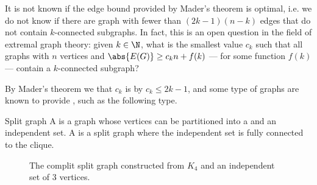\documentclass[a4paper, 12pt]{report}
\begin{document}
    It is not known if the edge bound provided by Mader's theorem is optimal, i.e. we do not know if there are graph with fewer than $(2k - 1)(n - k)$ edges that do not contain $k$-connected subgraphs. In fact, this is an open question in the field of extremal graph theory: given $k \in \N$, what is the smallest value $c_k$ such that all graphs with $n$ vertices and $\abs{E(G)} \ge c_kn + f(k)$ --- for some function $f(k)$ --- contain a $k$-connected subgraph?

    By Mader's theorem we that $c_k$ is  by $c_k \le 2k - 1$, and some type of graphs are known to provide , such as the following type.

    \begin{frameddefn}{Split graph}
        A  is a graph whose vertices can be partitioned into a  and an independent set. A  is a split graph where the independent set is fully connected to the clique.
    \end{frameddefn}

    \begin{figure}[H]
        \centering
        \caption{The complit split graph constructed from $K_4$ and an independent set of 3 vertices.}
    \end{figure}
\end{document}
